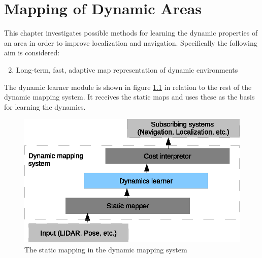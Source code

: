 \chapter{Mapping of Dynamic Areas}
\label{mapping_of_dynamic_areas}
This chapter investigates possible methods for learning the dynamic properties of an area in order to improve localization and navigation.
Specifically the following aim is considered:

\begin{enumerate}
    \setcounter{enumi}{1}
    \item Long-term, fast, adaptive map representation of dynamic environments
\end{enumerate}

The dynamic learner module is shown in figure \ref{fig:dynamic_learner_overview} in relation to the rest of the dynamic mapping system. It receives the static maps and uses these as the basis for learning the dynamics.  

\begin{figure}[htbp]
	\centering
	\includegraphics[scale=1]{chapters/mapping_of_dynamic_areas/figures/dynamic_overview.eps}
	\caption{The static mapping in the dynamic mapping system}
	\label{fig:dynamic_learner_overview}
\end{figure}









